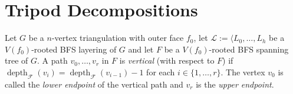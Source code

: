 \documentclass{patmorin}
\DeclareMathOperator{\depth}{depth}
\begin{document}
%
%
%
%

\section{Tripod Decompositions}

Let $G$ be a $n$-vertex triangulation with outer face $f_0$, let $\mathcal{L}:=\langle L_0,\ldots,L_h$ be a $V(f_0)$-rooted BFS layering of $G$ and let $F$ be a $V(f_0)$-rooted BFS spanning tree of $G$.  A path $v_0,\ldots,v_r$ in $F$ is \emph{vertical} (with respect to $F$) if $\depth_\mathcal{F}(v_i)=\depth_{\mathcal{F}}(v_{i-1})-1$ for each $i\in\{1,\ldots,r\}$. The vertex $v_0$ is called the \emph{lower endpoint} of the vertical path and $v_r$ is the \emph{upper endpoint}.
\end{document}
